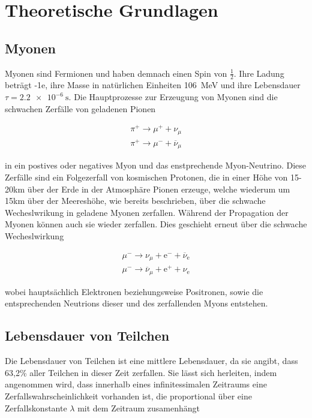 \section{Theoretische Grundlagen}
    \subsection{Myonen}
        Myonen sind Fermionen und haben demnach einen Spin von $\frac{1}{2}$. Ihre Ladung beträgt -1e, ihre Masse in natürlichen Einheiten \SI{106}{\mega\electronvolt} und ihre Lebensdauer 
        $\tau = \SI{2.2e-6}{\second}$. Die Hauptprozesse zur Erzeugung von Myonen sind die schwachen Zerfälle von geladenen Pionen
        
        \begin{align*}
            \pi^+ \longrightarrow \mu^+ + \nu_{\mu} \\
            \pi^+ \longrightarrow \mu^- + \overline{\nu}_{\mu}
        \end{align*}

        in ein postives oder negatives Myon und das enstprechende Myon-Neutrino. Diese Zerfälle sind ein Folgezerfall von kosmischen Protonen, die in einer Höhe von 15-20km über der Erde in der Atmosphäre
        Pionen erzeuge, welche wiederum um 15km über der Meereshöhe, wie bereits beschrieben, über die schwache Wecheslwrikung in geladene Myonen zerfallen. Während der Propagation der Myonen können auch sie 
        wieder zerfallen. Dies geschieht erneut über die schwache Wecheslwirkung 

        \begin{align*}
            \mu^- \longrightarrow \nu_{\mu} + \text{e}^- + \overline{\nu}_{\text{e}} \\
            \mu^- \longrightarrow \overline{\nu}_{\mu} + \text{e}^+ + \nu_{\text{e}} 
        \end{align*}

        wobei hauptsächlich Elektronen beziehungsweise Positronen, sowie die entsprechenden Neutrions dieser und des zerfallenden Myons entstehen.

    \subsection{Lebensdauer von Teilchen}
        Die Lebensdauer von Teilchen ist eine mittlere Lebensdauer, da sie angibt, dass 63,2\% aller Teilchen in dieser Zeit zerfallen. Sie lässt sich herleiten, indem angenommen wird, dass innerhalb
        eines infinitessimalen Zeitraums eine Zerfallswahrscheinlichkeit vorhanden ist, die proportional über eine Zerfallskonstante $\lambda$ mit dem Zeitraum zusamenhängt

